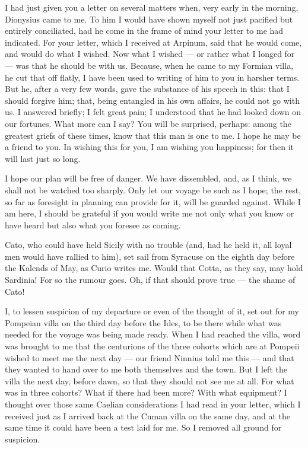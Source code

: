 

 I had just given you a letter on several matters when, very early in the morning, Dionysius came to me. To him I would have shown myself not just pacified but entirely conciliated, had he come in the frame of mind your letter to me had indicated. For your letter, which I received at Arpinum, said that he would come, and would do what I wished. Now what I wished --- or rather what I longed for --- was that he should be with us. Because, when he came to my Formian villa, he cut that off flatly, I have been used to writing of him to you in harsher terms. But he, after a very few words, gave the substance of his speech in this: that I should forgive him; that, being entangled in his own affairs, he could not go with us. I answered briefly; I felt great pain; I understood that he had looked down on our fortunes. What more can I say? You will be surprised, perhaps: among the greatest griefs of these times, know that this man is one to me. I hope he may be a friend to you. In wishing this for you, I am wishing you happiness; for then it will last just so long.

 I hope our plan will be free of danger. We have dissembled, and, as I think, we shall not be watched too sharply. Only let our voyage be such as I hope; the rest, so far as foresight in planning can provide for it, will be guarded against. While I am here, I should be grateful if you would write me not only what you know or have heard but also what you foresee as coming.

 Cato, who could have held Sicily with no trouble (and, had he held it, all loyal men would have rallied to him), set sail from Syracuse on the eighth day before the Kalends of May, as Curio writes me. Would that Cotta, as they say, may hold Sardinia! For so the rumour goes. Oh, if that should prove true --- the shame of Cato!

 I, to lessen suspicion of my departure or even of the thought of it, set out for my Pompeian villa on the third day before the Ides, to be there while what was needed for the voyage was being made ready. When I had reached the villa, word was brought to me that the centurions of the three cohorts which are at Pompeii wished to meet me the next day --- our friend Ninnius told me this --- and that they wanted to hand over to me both themselves and the town. But I left the villa the next day, before dawn, so that they should not see me at all. For what was in three cohorts? What if there had been more? With what equipment? I thought over those same Caelian considerations I had read in your letter, which I received just as I arrived back at the Cuman villa on the same day, and at the same time it could have been a test laid for me. So I removed all ground for suspicion.

